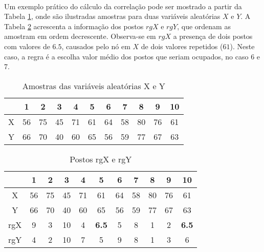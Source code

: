 \paragraph{} Um exemplo prático do cálculo da correlação pode ser mostrado a partir da Tabela \ref{tab:1}, onde são ilustradas amostras para duas variáveis aleatórias \begin{math}X\end{math} e \begin{math}Y\end{math}. A Tabela \ref{tab:2} acrescenta a informação dos postos \begin{math}rgX\end{math} e \begin{math}rgY\end{math}, que ordenam as amostram em ordem decrescente. Observa-se em \begin{math}rgX\end{math} a presença de dois postos com valores de \begin{math}6.5\end{math}, causados pelo nó em \begin{math}X\end{math} de dois valores repetidos (\begin{math}61\end{math}). Neste caso, a regra é a escolha valor médio dos postos que seriam ocupados, no caso 6 e 7.

\begin{table}[h!]
    \begin{center}
        \begin{tabular}{ c|cccccccccc }
            & 1 & 2 & 3 & 4 & 5 & 6 & 7 & 8 & 9 & 10 \\
            \hline
            X & 56 & 75 & 45 & 71 & 61 & 64 & 58 & 80 & 76 & 61 \\
            Y & 66 & 70 & 40 & 60 & 65 & 56 & 59 & 77 & 67 & 63 \\
        \end{tabular}
        \caption{Amostras das variáveis aleatórias X e Y}
        \label{tab:1}
    \end{center}
\end{table}

\begin{table}[h!]
    \begin{center}
        \begin{tabular}{ c|cccccccccc }
            & 1 & 2 & 3 & 4 & 5 & 6 & 7 & 8 & 9 & 10 \\
            \hline
            X & 56 & 75 & 45 & 71 & 61 & 64 & 58 & 80 & 76 & 61 \\
            Y & 66 & 70 & 40 & 60 & 65 & 56 & 59 & 77 & 67 & 63 \\
            \hline
            rgX & 9 & 3 & 10 & 4 & \textbf{6.5} & 5 & 8 & 1 & 2 & \textbf{6.5} \\
            rgY & 4 & 2 & 10 & 7 & 5 & 9 & 8 & 1 & 3 & 6 \\
        \end{tabular}
        \caption{Postos rgX e rgY}
        \label{tab:2}
    \end{center}
\end{table}

